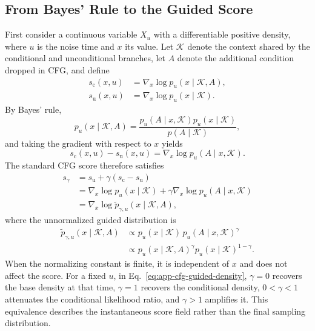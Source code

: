 \subsection{From Bayes' Rule to the Guided Score}

First consider a continuous variable $X_u$ with a differentiable positive density, where $u$ is the noise time and $x$ its value. Let $\mathcal K$ denote the context shared by the conditional and unconditional branches, let $A$ denote the additional condition dropped in CFG, and define
\begin{equation}
\begin{aligned}
    s_{\mathrm c}(x,u)
    &=\nabla_x\log p_u(x\mid \mathcal K,A),\\
    s_{\mathrm u}(x,u)
    &=\nabla_x\log p_u(x\mid \mathcal K).
\end{aligned}
\label{eq:app-cfg-scores}
\end{equation}
By Bayes' rule,
\begin{equation}
    p_u(x\mid \mathcal K,A)
    =\frac{p_u(A\mid x,\mathcal K)p_u(x\mid \mathcal K)}{p(A\mid \mathcal K)},
\end{equation}
and taking the gradient with respect to $x$ yields
\begin{equation}
    s_{\mathrm c}(x,u)-s_{\mathrm u}(x,u)
    =\nabla_x\log p_u(A\mid x,\mathcal K).
    \label{eq:app-cfg-score-difference}
\end{equation}
The standard CFG score therefore satisfies
\begin{equation}
\begin{aligned}
    s_\gamma
    &=s_{\mathrm u}+\gamma(s_{\mathrm c}-s_{\mathrm u})\\
    &=\nabla_x\log p_u(x\mid \mathcal K)
      +\gamma\nabla_x\log p_u(A\mid x,\mathcal K)\\
    &=\nabla_x\log \widetilde p_{\gamma,u}(x\mid \mathcal K,A),
\end{aligned}
\label{eq:app-cfg-guided-score}
\end{equation}
where the unnormalized guided distribution is
\begin{equation}
\begin{aligned}
    \widetilde p_{\gamma,u}(x\mid \mathcal K,A)
    &\propto
    p_u(x\mid \mathcal K)\,p_u(A\mid x,\mathcal K)^\gamma\\
    &\propto
    p_u(x\mid \mathcal K,A)^\gamma
    p_u(x\mid \mathcal K)^{1-\gamma}.
\end{aligned}
\label{eq:app-cfg-guided-density}
\end{equation}
When the normalizing constant is finite, it is independent of $x$ and does not affect the score. For a fixed $u$, in Eq.~\eqref{eq:app-cfg-guided-density}, $\gamma=0$ recovers the base density at that time, $\gamma=1$ recovers the conditional density, $0<\gamma<1$ attenuates the conditional likelihood ratio, and $\gamma>1$ amplifies it. This equivalence describes the instantaneous score field rather than the final sampling distribution.

